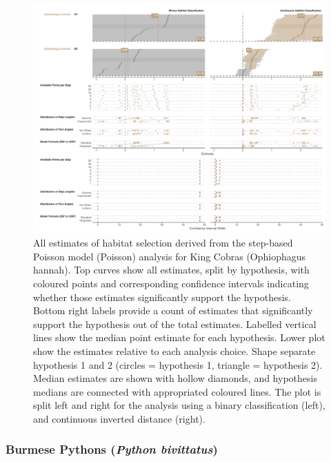 \documentclass[10pt,a4paper]{article}
\begin{document}
\begin{figure}
\includegraphics[width=1\linewidth]{../../figures/specCurve_Ophiophagus hannah_pois} \caption{All estimates of habitat selection derived from the step-based Poisson model (Poisson) analysis for King Cobras (Ophiophagus hannah). Top curves show all estimates, split by hypothesis, with coloured points and corresponding confidence intervals indicating whether those estimates significantly support the hypothesis. Bottom right labels provide a count of estimates that significantly support the hypothesis out of the total estimates. Labelled vertical lines show the median point estimate for each hypothesis. Lower plot show the estimates relative to each analysis choice. Shape separate hypothesis 1 and 2 (circles = hypothesis 1, triangle = hypothesis 2). Median estimates are shown with hollow diamonds, and hypothesis medians are connected with appropriated coloured lines. The plot is split left and right for the analysis using a binary classification (left), and continuous inverted distance (right).}\label{fig:specCurvePoisOPHA}
\end{figure}

\subsubsection{\texorpdfstring{Burmese Pythons (\emph{Python bivittatus})}{Burmese Pythons (Python bivittatus)}}\label{burmese-pythons-python-bivittatus}
\end{document}
